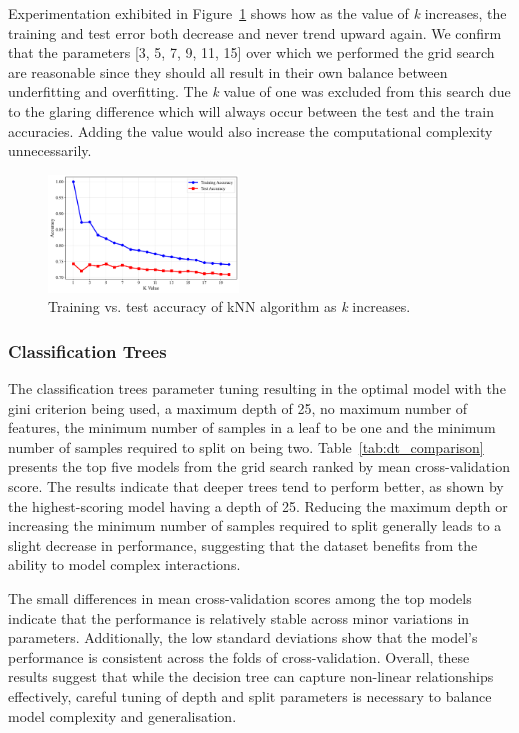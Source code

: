 \documentclass[10pt, conference]{IEEEtran}
\begin{document}
Experimentation exhibited in Figure~\ref{fig:knn-perf} shows how as the value of \textit{k} increases, the training and test error both decrease and never trend upward again. We confirm that the parameters [3, 5, 7, 9, 11, 15] over which we performed the grid search are reasonable since they should all result in their own balance between underfitting and overfitting. The \textit{k} value of one was excluded from this search due to the glaring difference which will always occur between the test and the train accuracies. Adding the value would also increase the computational complexity unnecessarily.

\begin{figure}[htbp]
	\centering
	\includegraphics[width=0.45\textwidth]{../plots/knn_performance.pdf}
	\caption{Training vs. test accuracy of kNN algorithm as \textit{k} increases.}
	\label{fig:knn-perf}
\end{figure}


\subsubsection{Classification Trees}
The classification trees parameter tuning resulting in the optimal model with the gini criterion being used, a maximum depth of 25, no maximum number of features, the minimum number of samples in a leaf to be one and the minimum number of samples required to split on being two. Table~\ref{tab:dt_comparison} presents the top five models from the grid search ranked by mean cross-validation score. The results indicate that deeper trees tend to perform better, as shown by the highest-scoring model having a depth of 25. Reducing the maximum depth or increasing the minimum number of samples required to split generally leads to a slight decrease in performance, suggesting that the dataset benefits from the ability to model complex interactions.

The small differences in mean cross-validation scores among the top models indicate that the performance is relatively stable across minor variations in parameters. Additionally, the low standard deviations show that the model’s performance is consistent across the folds of cross-validation. Overall, these results suggest that while the decision tree can capture non-linear relationships effectively, careful tuning of depth and split parameters is necessary to balance model complexity and generalisation.
\end{document}
